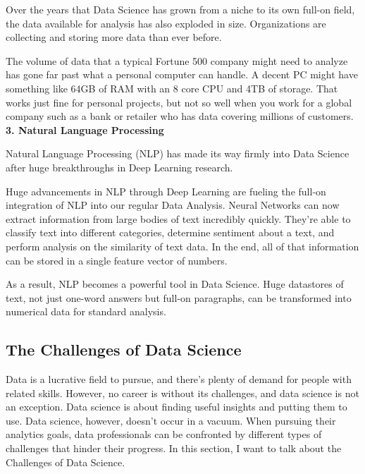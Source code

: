 \documentclass[a4paper, 11pt,twoside=true]{scrartcl}
\begin{document}
\quad Over the years that Data Science has grown from a niche to its own full-on field, the data available for analysis has also exploded in size. Organizations are collecting and storing more data than ever before.

\quad The volume of data that a typical Fortune 500 company might need to analyze has gone far past what a personal computer can handle. A decent PC might have something like 64GB of RAM with an 8 core CPU and 4TB of storage. That works just fine for personal projects, but not so well when you work for a global company such as a bank or retailer who has data covering millions of customers.\\
\textbf{3. Natural Language Processing}

\quad Natural Language Processing (NLP) has made its way firmly into Data Science after huge breakthroughs in Deep Learning research.

\quad Huge advancements in NLP through Deep Learning are fueling the full-on integration of NLP into our regular Data Analysis. Neural Networks can now extract information from large bodies of text incredibly quickly. They’re able to classify text into different categories, determine sentiment about a text, and perform analysis on the similarity of text data. In the end, all of that information can be stored in a single feature vector of numbers.

\quad As a result, NLP becomes a powerful tool in Data Science. Huge datastores of text, not just one-word answers but full-on paragraphs, can be transformed into numerical data for standard analysis. 

\subsection{The Challenges of Data Science}
\qquad Data is a lucrative field to pursue, and there’s plenty of demand for people with related skills. However, no career is without its challenges, and data science is not an exception. Data science is about finding useful insights and putting them to use. Data science, however, doesn’t occur in a vacuum. When pursuing their analytics goals, data professionals can be confronted by different types of challenges that hinder their progress. In this section, I want to talk about the Challenges of Data Science.
\end{document}
